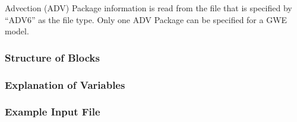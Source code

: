 Advection (ADV) Package information is read from the file that is specified by ``ADV6'' as the file type.  Only one ADV Package can be specified for a GWE model. 

\vspace{5mm}
\subsubsection{Structure of Blocks}


\vspace{5mm}
\subsubsection{Explanation of Variables}
\begin{description}

\end{description}

\vspace{5mm}
\subsubsection{Example Input File}


